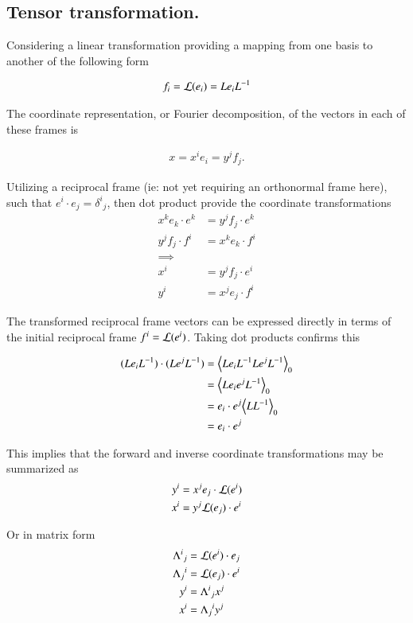 \documentclass{article}
\begin{document}
\subsection{ Tensor transformation. }

Considering a linear transformation providing a mapping from one basis to another of the following form

\begin{align*}
f_i = \mathcal{L}(e_i) = L e_i L^{-1}
\end{align*}

The coordinate representation, or Fourier decomposition, of the vectors in each of these frames is

\begin{align*}
x = x^i e_i = y^j f_j.
\end{align*}

Utilizing a reciprocal frame (ie: not yet requiring an orthonormal frame here), such that $e^i \cdot e_j = {\delta^i}_j$, 
then dot product provide the coordinate transformations
\begin{align*}
x^k e_k \cdot e^k &= y^j f_j \cdot e^k \\
y^j f_j \cdot f^i &= x^k e_k \cdot f^i \\
\implies \\
x^i &= y^j f_j \cdot e^i \\
y^i &= x^j e_j \cdot f^i
\end{align*}

The transformed reciprocal frame vectors can be expressed directly in terms of the initial reciprocal frame $f^i = \mathcal{L}(e^i)$.  Taking
dot products confirms this

\begin{align*}
(L e_i L^{-1}) \cdot (L e^j L^{-1}) 
&= {\left\langle{{ L e_i L^{-1} L e^j L^{-1} }}\right\rangle}_{0} \\
&= {\left\langle{{ L e_i e^j L^{-1} }}\right\rangle}_{0} \\
&= e_i \cdot e^j {\left\langle{{ L L^{-1} }}\right\rangle}_{0} \\
&= e_i \cdot e^j
\end{align*}

This implies that the forward and inverse coordinate transformations may be summarized as
\begin{align*}
y^i &= x^j e_j \cdot \mathcal{L}(e^i) \\
x^i &= y^j \mathcal{L}(e_j) \cdot e^i \\
\end{align*}

Or in matrix form
\begin{align}\label{eqn:coordinateTxTensors}
{\Lambda^i}_j &= \mathcal{L}(e^i) \cdot e_j \\
{\Lambda_j}^i &= \mathcal{L}(e_j) \cdot e^i \\
y^i &= {\Lambda^i}_j x^j \\
x^i &= {\Lambda_j}^i y^j
\end{align}
\end{document}
